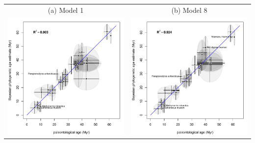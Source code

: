 \documentclass{standalone}
\begin{document}
\begin{tabular}{cc}
(a) Model 1 & (b) Model 8 \\
\includegraphics[width=7cm]{1_penguins_eNprior/1_phyloAgeVsGeoAge.pdf} 
& 
\includegraphics[width=7cm]{8_penguins_eNprior/8_phyloAgeVsGeoAge.pdf}
\\
\end{tabular}
\end{document}
